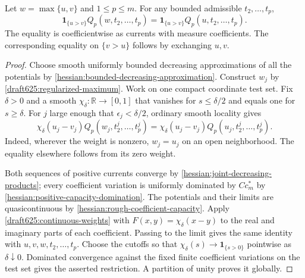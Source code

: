 \begin{proposition}\label{draft625:strict-locality}
Let $w=\max\{u,v\}$ and $1\leq p\leq m$. For any bounded
admissible $t_2,\ldots,t_p$,
\[
 \mathbf1_{\{u>v\}}Q_p(w,t_2,\ldots,t_p)
       =\mathbf1_{\{u>v\}}Q_p(u,t_2,\ldots,t_p).
\]
The equality is coefficientwise as currents with measure
coefficients. The corresponding equality on $\{v>u\}$ follows
by exchanging $u,v$.
\end{proposition}
\begin{proof}
Choose smooth uniformly bounded decreasing approximations of all
the potentials by \cref{hessian:bounded-decreasing-approximation}.
Construct $w_j$ by \cref{draft625:regularized-maximum}. Work on
one compact coordinate test set. Fix $\delta>0$ and a smooth
$\chi_\delta:\mathbb R\to[0,1]$ that vanishes for
$s\leq\delta/2$ and equals one for $s\geq\delta$.
For $j$ large enough that $\epsilon_j<\delta/2$, ordinary smooth
locality gives
\[
 \chi_\delta(u_j-v_j)Q_p(w_j,t_2^j,\ldots,t_p^j)
       =\chi_\delta(u_j-v_j)Q_p(u_j,t_2^j,\ldots,t_p^j).
\]
Indeed, wherever the weight is nonzero, $w_j=u_j$ on an open
neighborhood. The equality elsewhere follows from its zero weight.

Both sequences of positive currents converge by
\cref{hessian:joint-decreasing-products}; every coefficient variation
is uniformly dominated by $C c_m^*$ by
\cref{hessian:positive-capacity-domination}. The potentials and their
limits are quasicontinuous by \cref{hessian:rough-coefficient-capacity}.
Apply \cref{draft625:continuous-weights} with
$F(x,y)=\chi_\delta(x-y)$ to the real and imaginary parts of
each coefficient. Passing to the limit gives the same identity
with $u,v,w,t_2,\ldots,t_p$.
Choose the cutoffs so that $\chi_\delta(s)\to\mathbf1_{\{s>0\}}$
pointwise as $\delta\downarrow0$. Dominated convergence against
the fixed finite coefficient variations on the test set gives
the asserted restriction. A partition of unity proves it globally.
\end{proof}

